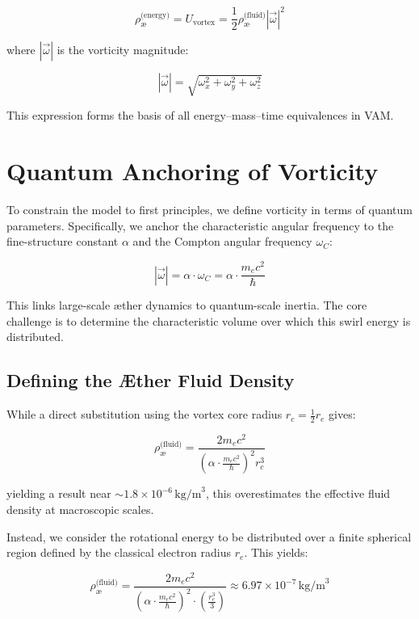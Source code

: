 \documentclass[12pt]{article}
\begin{document}
    \[
        \rho_{\text{\ae}}^{\text{(energy)}} = U_{\text{vortex}} = \frac{1}{2} \rho_{\text{\ae}}^{\text{(fluid)}} |\vec{\omega}|^2
    \]

    where \( |\vec{\omega}| \) is the vorticity magnitude:

    \[
        |\vec{\omega}| = \sqrt{\omega_x^2 + \omega_y^2 + \omega_z^2}
    \]

    This expression forms the basis of all energy–mass–time equivalences in VAM.

    \section{Quantum Anchoring of Vorticity}

    To constrain the model to first principles, we define vorticity in terms of quantum parameters. Specifically, we anchor the characteristic angular frequency to the fine-structure constant \( \alpha \) and the Compton angular frequency \( \omega_C \):

    \[
        |\vec{\omega}| = \alpha \cdot \omega_C = \alpha \cdot \frac{m_e c^2}{\hbar}
    \]

    This links large-scale æther dynamics to quantum-scale inertia. The core challenge is to determine the characteristic volume over which this swirl energy is distributed.

    \subsection{Defining the Æther Fluid Density}

    While a direct substitution using the vortex core radius \( r_c = \frac{1}{2} r_e \) gives:

    \[
        \rho_{\text{\ae}}^{\text{(fluid)}} = \frac{2 m_e c^2}{\left(\alpha \cdot \frac{m_e c^2}{\hbar}\right)^2 r_c^3}
    \]

    yielding a result near \( \sim 1.8 \times 10^{-6} \, \text{kg/m}^3 \), this overestimates the effective fluid density at macroscopic scales.

    Instead, we consider the rotational energy to be distributed over a finite spherical region defined by the classical electron radius \( r_e \). This yields:

    \[
        \rho_{\text{\ae}}^{\text{(fluid)}} = \frac{2 m_e c^2}{\left(\alpha \cdot \frac{m_e c^2}{\hbar}\right)^2 \cdot \left(\frac{r_e^3}{3}\right)} \approx 6.97 \times 10^{-7} \, \text{kg/m}^3
    \]
\end{document}
